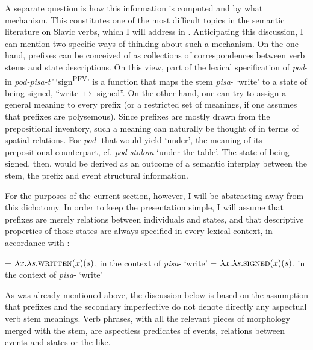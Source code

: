 \documentclass[output=paper,colorlinks,citecolor=brown]{langscibook}
\begin{document}
A separate question is how this information is computed and by what mechanism. This constitutes one of the most difficult topics in the semantic literature on Slavic verbs, which I will address in . Anticipating this discussion, I can mention two specific ways of thinking about such a mechanism. On the one hand, prefixes can be conceived of as collections of correspondences between verb stems and state descriptions. On this view, part of the lexical specification of \textit{pod}- in \textit{pod-pisa-t’} ‘sign\textsuperscript{PFV}’ is a function that maps the stem \textit{pisa}- ‘write’ to a state of being signed, “write $\mapsto$ signed”. On the other hand, one can try to assign a general  meaning to every prefix (or a restricted set of meanings, if one assumes that prefixes are polysemous). Since prefixes are mostly drawn from the prepositional inventory, such a meaning can naturally be thought of in terms of spatial relations. For \textit{pod}- that would yield ‘under’, the meaning of its prepositional counterpart, cf. \textit{pod stolom} ‘under the table’. The state of being signed, then, would be derived as an outcome of a semantic interplay between the stem, the prefix and event structural information. 

For the purposes of the current section, however, I will be abstracting away from this dichotomy. In order to keep the presentation simple, I will assume that prefixes are merely relations between individuals and states, and that descriptive properties of those states are always specified in every lexical context, in accordance with : 

\ea
\ea  {} = $\lambda x.\lambda s.\textsc{written}(x)(s)$, in the context of \textit{pisa}- ‘write’
\ex   {} = $\lambda x.\lambda s. \textsc{signed}(x)(s)$, in the context of \textit{pisa}- ‘write’
\z
\z

\noindent As was already mentioned above, the discussion below is based on the assumption that prefixes and the secondary imperfective do not denote directly any aspectual  verb stem meanings. Verb phrases, with all the relevant pieces of morphology merged with the stem, are aspectless predicates of events, relations between events and states or the like. 
\end{document}
